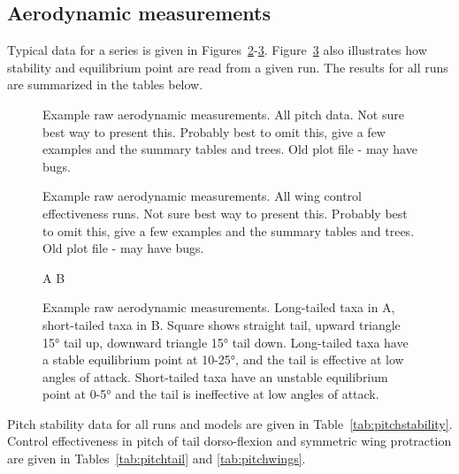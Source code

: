 \subsection{Aerodynamic measurements}
Typical data for a series is given in Figures~\ref{fig:exampleall}-\ref{fig:example}.  Figure~\ref{fig:example} also illustrates how stability and equilibrium point are read from a given run.  The results for all runs are summarized in the tables below. 
\begin{figure}[!ht]
\begin{center}
\end{center}
\caption{
{ Example raw aerodynamic measurements.}  All pitch data.  Not sure best way to present this.  Probably best to omit this, give a few examples and the summary tables and trees. Old plot file - may have bugs.    
}
\label{fig:exampleall}
\end{figure}
\begin{figure}[!ht]
\begin{center}
\end{center}
\caption{
{ Example raw aerodynamic measurements.}  All wing control effectiveness runs.  Not sure best way to present this.  Probably best to omit this, give a few examples and the summary tables and trees. Old plot file - may have bugs.    
}
\label{fig:exampleall}
\end{figure}
\begin{figure}[!ht]
\begin{center}
A%
B%
\end{center}
\caption{
{ Example raw aerodynamic measurements.}  Long-tailed taxa in A, short-tailed taxa in B.  Square shows straight tail, upward triangle \ang{15} tail up, downward triangle \ang{15} tail down. Long-tailed taxa have a stable equilibrium point at \num{10}-\ang{25}, and the tail is effective at low angles of attack.  Short-tailed taxa have an unstable equilibrium point at \num{0}-\ang{5} and the tail is ineffective at low angles of attack.   
}
\label{fig:example}
\end{figure}

Pitch stability data for all runs and models are given in Table~\ref{tab:pitchstability}.  Control effectiveness in pitch of tail dorso-flexion and symmetric wing protraction are given in Tables~\ref{tab:pitchtail} and \ref{tab:pitchwings}.
%
%
%

